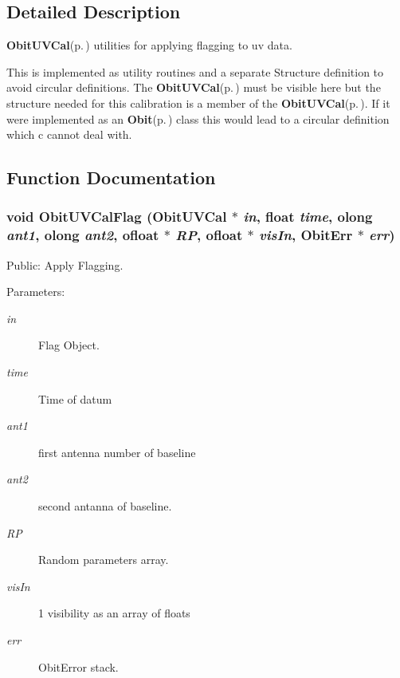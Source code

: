 \subsection{Detailed Description}
{\bf Obit\-UVCal}{\rm (p.\,\pageref{structObitUVCal})} utilities for applying flagging to uv data. 

This is implemented as utility routines and a separate Structure definition to avoid circular definitions. The {\bf Obit\-UVCal}{\rm (p.\,\pageref{structObitUVCal})} must be visible here but the structure needed for this calibration is a member of the {\bf Obit\-UVCal}{\rm (p.\,\pageref{structObitUVCal})}. If it were implemented as an {\bf Obit}{\rm (p.\,\pageref{structObit})} class this would lead to a circular definition which c cannot deal with.

\subsection{Function Documentation}
\subsubsection{\setlength{\rightskip}{0pt plus 5cm}void Obit\-UVCal\-Flag ({\bf Obit\-UVCal} $\ast$ {\em in}, float {\em time}, {\bf olong} {\em ant1}, {\bf olong} {\em ant2}, {\bf ofloat} $\ast$ {\em RP}, {\bf ofloat} $\ast$ {\em vis\-In}, {\bf Obit\-Err} $\ast$ {\em err})}\label{ObitUVCalFlag_8h_a1}


Public: Apply Flagging. 

\begin{Desc}
\item[Parameters:]
\begin{description}
\item[{\em in}]Flag Object. \item[{\em time}]Time of datum \item[{\em ant1}]first antenna number of baseline \item[{\em ant2}]second antanna of baseline. \item[{\em RP}]Random parameters array. \item[{\em vis\-In}]1 visibility as an array of floats \item[{\em err}]Obit\-Error stack. \end{description}
\end{Desc}
